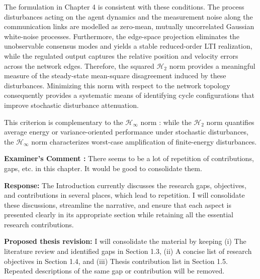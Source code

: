 \documentclass[11pt,a4paper]{article}
\newcounter{examcomment}
\renewcommand{\theexamcomment}{\arabic{examcomment}}
\newcommand{\comment}[1]{%
	\refstepcounter{examcomment}%
	\par\vspace{5pt}\noindent
	\colorbox{gray!13}{%
		\parbox{\dimexpr\linewidth-2\fboxsep}{%
			\textbf{Examiner's Comment \theexamcomment:} #1%
		}%
	}%
	\par
}
\newcommand{\response}{\par\textbf{Response:} }
\newcommand{\revision}{\par\textbf{Proposed thesis revision:} }
\begin{document}
The formulation in Chapter 4 is consistent with these conditions. The process disturbances acting on the agent dynamics and the measurement noise along the communication links are modelled as zero-mean, mutually uncorrelated Gaussian white-noise processes. Furthermore, the edge-space projection eliminates the unobservable consensus modes and yields a stable reduced-order LTI realization, while the regulated output captures the relative position and velocity errors across the network edges. Therefore, the squared $\mathcal{H}_2$ norm provides a meaningful measure of the steady-state mean-square disagreement induced by these disturbances. Minimizing this norm with respect to the network topology consequently provides a systematic means of identifying cycle configurations that improve stochastic disturbance attenuation.

This criterion is complementary to the $\mathcal{H}_\infty$ norm \cite{dullerud2000course}: while the $\mathcal{H}_2$ norm quantifies average energy or variance-oriented performance under stochastic disturbances, the $\mathcal{H}_\infty$ norm characterizes worst-case amplification of finite-energy disturbances.


\comment{There seems to be a lot of repetition of contributions, gaps, etc. in this chapter. It would be good to consolidate them.}
\response
The Introduction currently discusses the research gaps, objectives, and contributions in several places, which lead to repetition. I will consolidate these discussions, streamline the narrative, and ensure that each aspect is presented clearly in its appropriate section while retaining all the essential research contributions.

\revision
I will consolidate the material by keeping (i) The literature review and identified gaps in Section 1.3, (ii) A concise list of research objectives in Section 1.4, and (iii) Thesis contribution list in Section 1.5. Repeated descriptions of the same gap or contribution will be removed.
\end{document}

